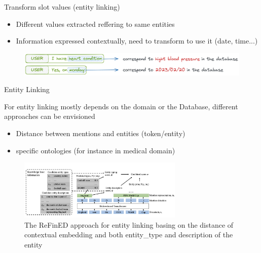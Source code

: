 \documentclass[10pt,aspectratio=169]{beamer}
\begin{document}
\begin{frame}
    \begin{block}{Transform slot values (entity linking)}
        \begin{itemize}
            \item Different values extracted reffering to same entities
            \item Information expressed contextually, need to transform to use it (date, time...)
        \end{itemize}
    \end{block}
    \begin{figure}[b]
        \centering
        \includegraphics[width=1.\textwidth]{media/in_context_el.png}
        \label{fig:my_label}
    \end{figure}
    
\end{frame}
\begin{frame}{Entity Linking}
 
             For entity linking mostly depends on the domain  or the Database, different approaches can be envisioned
            \begin{itemize}
                \item Distance between mentions and entities (token/entity)
                \item specific ontologies (for instance in medical domain)
            \end{itemize}
        \begin{figure}
            \centering
            \includegraphics[width=0.7\textwidth]{media/refined.png}
            \caption{The ReFinED approach for entity linking basing on the distance of contextual embedding and both entity\_type and description of the entity \cite{ayoola-2022-refined}}
            \label{fig:refined}
        \end{figure}
\end{frame}
\end{document}
